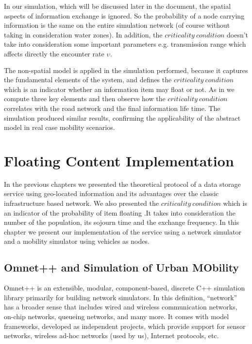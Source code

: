 In our simulation, which will be discussed later in the document, the spatial
aspects of information exchange is ignored. So the probability of a node
carrying information is the same on the entire simulation network (of course
without taking in consideration water zones). In addition, the $criticality\ 
condition$ doesn't take into consideration some important parameters e.g. 
transmission range which affects directly the encounter rate $\upsilon$.

The non-spatial model is applied in the simulation performed, because it
captures the fundamental elements of the system, and defines the $criticality\ 
condition$ which is an indicator whether an information item may float or not.
As in \cite{percomfloatingcontent} we compute three key elements and then observe
how the $criticality\ condition$ correlates with the road network and the final
information life time. The simulation produced similar results, confirming the
applicability of the abstract model in real case mobility scenarios.





\chapter{Floating Content Implementation} \label{chap3}

In the previous chapters we presented the theoretical protocol of a data storage
service using geo-located information and its advantages over the classic
infrastructure based network. We also presented the $criticality\ condition$
which is an indicator of the probability of item floating .It takes into
consideration the number of the population, its sojourn time and the exchange
frequency. In this chapter we present our implementation of the service using a
network simulator and a mobility simulator using vehicles as nodes.

\section{Omnet++ and Simulation of Urban MObility}

Omnet++ is an extensible, modular, component-based, discrete C++ simulation
library primarily for building network simulators. In this definition, ``network''
has a broader sense that includes wired and wireless communication networks,
on-chip networks, queueing networks, and many more. It comes with model
frameworks, developed as independent projects, which provide support for sensor
networks, wireless ad-hoc networks (used by us), Internet protocols, etc.

